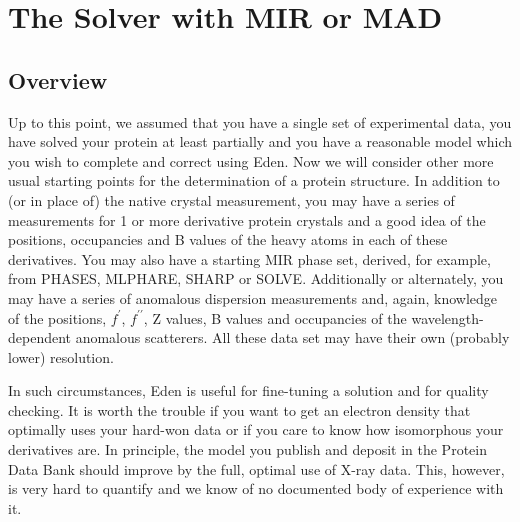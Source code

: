 \documentclass{report}
\begin{document}
\chapter {The Solver with MIR or MAD}
\label{mir-mad}

\section {Overview}
\label{mir-overview}

Up to this point, we assumed that you have a single set of experimental data,
you have solved your protein at least
partially and you have a reasonable model which you wish to complete
and correct using Eden.  
Now we will consider other more usual starting points for the
determination of a protein structure.  In addition to (or 
in place of) the native crystal
measurement, you may have a series of measurements for 1 or more derivative
protein crystals and a good idea of the positions,
occupancies and B values of the heavy atoms in each of these derivatives.  
You may also have a starting MIR
phase set, derived, for example, from PHASES, MLPHARE, SHARP or SOLVE.  
Additionally or alternately, you may have a series of anomalous dispersion
measurements and, again, knowledge of the positions, 
$f^\prime$, $f^{\prime\prime}$, Z values,
B values and occupancies of the wavelength-dependent anomalous scatterers.
All these data set may have their own (probably lower) resolution.

\vspace {0.1in}

In such circumstances, Eden is useful for fine-tuning a solution and for 
quality checking.  It is worth the trouble if you want to get an electron
density that optimally uses your hard-won data or if you care to know how
isomorphous your derivatives are.  In principle, the model you publish and
deposit in the Protein Data Bank should improve by the full, optimal use of
X-ray data.  This, however, is very hard to quantify and we know of no 
documented body of experience with it.

\vspace {0.1in}
\end{document}
